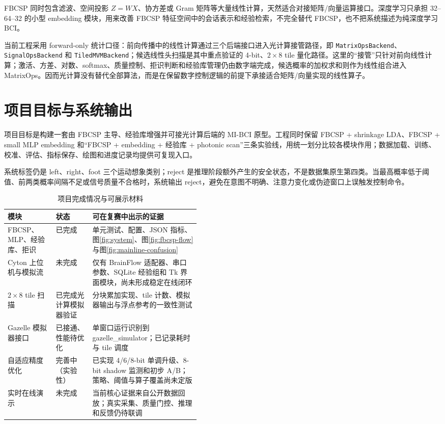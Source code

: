 \documentclass[
    TwoSide=false,
    Degree=graduate,
    GradLevel=master,
    Type=thesis,
    Title={光电混合运动想象脑机接口技术文档}
]{zjuthesis}
\begin{document}
FBCSP 同时包含滤波、空间投影 $Z=WX$、协方差或 Gram 矩阵等大量线性计算，天然适合对接矩阵/向量运算接口。深度学习只承担 32--64--32 的小型 embedding 模块，用来改善 FBCSP 特征空间中的会话表示和经验检索，不完全替代 FBCSP，也不把系统描述为纯深度学习 BCI。

当前工程采用 forward-only 统计口径：前向传播中的线性计算通过三个后端接口进入光计算接管路径，即 \texttt{MatrixOps}\allowbreak\texttt{Backend}、\texttt{SignalOps}\allowbreak\texttt{Backend} 和 \texttt{TiledMVM}\allowbreak\texttt{Backend}；候选线性头扫描是其中重点验证的 4-bit、$2\times8$ tile 量化路径。这里的“接管”只针对前向线性计算；激活、方差、对数、softmax、质量控制、拒识判断和经验库管理仍由数字端完成，候选概率的加权求和则作为线性组合进入 MatrixOps。因而光计算没有替代全部算法，而是在保留数字控制逻辑的前提下承接适合矩阵/向量实现的线性算子。

\section{项目目标与系统输出}
项目目标是构建一套由 FBCSP 主导、经验库增强并可接光计算后端的 MI-BCI 原型。工程同时保留 FBCSP + shrinkage LDA、FBCSP + small MLP embedding 和“FBCSP + embedding + 经验库 + photonic scan”三条实验线，用统一划分比较各模块作用；数据加载、训练、校准、评估、指标保存、绘图和进度记录均提供可复现入口。

系统标签仍是 left、right、foot 三个运动想象类别；reject 是推理阶段额外产生的安全状态，不是数据集原生第四类。当最高概率低于阈值、前两类概率间隔不足或信号质量不合格时，系统输出 reject，避免在意图不明确、注意力变化或伪迹窗口上误触发控制命令。

\begin{table}[H]
\centering\small
\renewcommand{\arraystretch}{0.95}
\caption{项目完成情况与可展示材料}\label{tab:status}
\begin{tabularx}{0.95\linewidth}{|L{0.25\linewidth}|L{0.19\linewidth}|X|}\hline
模块 & 状态 & 可在复赛中出示的证据 \\ \hline
FBCSP、MLP、经验库、拒识 & 已完成 & 单元测试、配置、JSON 指标、图\ref{fig:system}、图\ref{fig:fbcsp-flow}与图\ref{fig:mainline-confusion} \\ \hline
Cyton 上位机与模拟流 & 未完成 & 仅有 BrainFlow 适配器、串口参数、SQLite 经验组和 Tk 界面模块，尚未形成稳定在线闭环 \\ \hline
$2\times8$ tile 扫描 & 已完成光计算模拟器验证 & 分块累加实现、tile 计数、模拟器输出与浮点参考的一致性测试 \\ \hline
Gazelle 模拟器接口 & 已接通、性能待优化 & 单窗口运行识别到 gazelle\_simulator；已记录耗时与 tile 调度 \\ \hline
自适应精度优化 & 完善中（实验性） & 已实现 4/6/8-bit 单调升级、8-bit shadow 监测和初步 A/B；策略、阈值与算子覆盖尚未定版 \\ \hline
实时在线演示 & 未完成 & 当前核心证据来自公开数据回放；真实采集、质量门控、推理和反馈仍待联调 \\ \hline
\end{tabularx}
\end{table}
\end{document}
